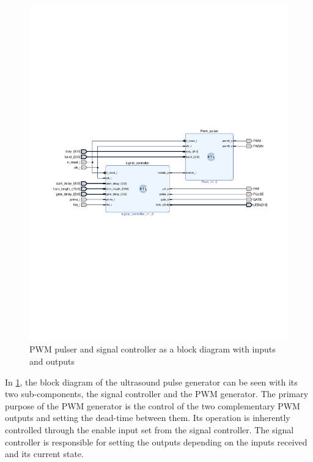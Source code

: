 \begin{figure}[htbp]
	\centering
	\includegraphics[width=.8\linewidth]{Figures/4_controlsystem_pulser.pdf}
	\caption{PWM pulser and signal controller as a block diagram with inputs and outputs}
	\label{fig:4_controlsystem_pulser}
\end{figure}
In \cref{fig:4_controlsystem_pulser}, the block diagram of the ultrasound pulse generator can be seen with its two sub-components, the signal controller and the PWM generator. The primary purpose of the PWM generator is the control of the two complementary PWM outputs and setting the dead-time between them. Its operation is inherently controlled through the enable input set from the signal controller. The signal controller is responsible for setting the outputs depending on the inputs received and its current state.

